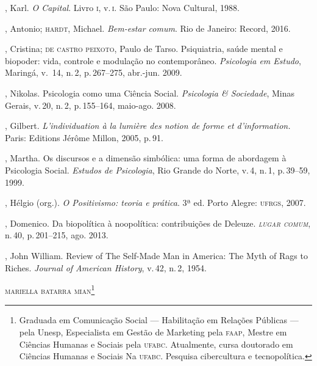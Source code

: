 \begin{bibliohedra}
, Karl. \textit{O Capital}. Livro \textsc{i}, v.\,\textsc{i}. São Paulo: Nova
Cultural, 1988.

, Antonio; \textsc{hardt}, Michael. \textit{Bem-estar comum}. Rio de
Janeiro: Record, 2016.

, Cristina; \textsc{de castro peixoto}, Paulo de Tarso.
Psiquiatria, saúde mental e biopoder: vida, controle e modulação
no contemporâneo. \textit{Psicologia em Estudo}, Maringá, v.\, 14, n.\,2, p.\,267--275,
 abr.-jun. 2009.

, Nikolas. Psicologia como uma Ciência Social. \textit{Psicologia
\& Sociedade}, Minas Gerais, v.\,20, n.\,2, p.\,155--164,  maio-ago. 2008.

, Gilbert. \textit{L'individuation à la lumière des notion de
forme et d'information.} Paris: Editions Jérôme Millon, 2005, p.\,91.

, Martha. Os discursos e a dimensão simbólica: uma
forma de abordagem à Psicologia Social. \textit{Estudos de Psicologia}, Rio
Grande do Norte, v.\,4, n.\,1, p.\,39--59, 1999.

, Hélgio (org.). \textit{O Positivismo: teoria e prática}. 3ª
ed. Porto Alegre: \textsc{ufrgs}, 2007.

, Domenico. Da biopolítica à noopolítica: contribuições de Deleuze. \textit{\textsc{lugar comum}}, n.\,40, p.\,201--215, ago. 2013.

, John William. Review of The Self-Made Man in America:
The Myth of Rags to Riches. \textit{Journal of American History}, v.\,42, n.\,2, 1954.

\end{bibliohedra}




\begin{flushright}
\textsc{mariella batarra mian\footnote{Graduada em Comunicação Social --- Habilitação em Relações Públicas --- pela Unesp, Especialista em Gestão de Marketing pela \textsc{faap}, Mestre em Ciências Humanas e Sociais pela \textsc{ufabc}. Atualmente, cursa doutorado em Ciências Humanas e Sociais Na \textsc{ufabc}. Pesquisa cibercultura e tecnopolítica.}}
\end{flushright}


